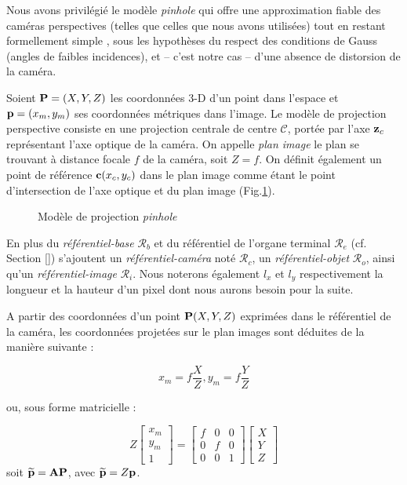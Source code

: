 Nous avons privilégié le modèle {\it pinhole} qui offre une approximation 
fiable des caméras perspectives (telles que celles que nous avons utilisées) 
tout en restant formellement simple\cite{Faugeras:1993} \cite{hartley2004}, 
sous 
les hypothèses du respect des conditions de Gauss (angles de faibles 
incidences), et -- c'est notre cas -- d'une absence de distorsion de la caméra.

Soient ${\bf P} = (X, Y, Z)$ les coordonnées 3-D d'un point dans l'espace et 
${\bf p} = (x_m, y_m)$ ses coordonnées m\'etriques dans l'image. Le modèle de 
projection perspective consiste en une projection centrale de centre $\mathcal 
C$, portée par l'axe ${\bf z}_c$ représentant l'axe optique de la caméra. On 
appelle {\it plan image} le plan se trouvant à distance focale $f$ de la 
caméra, 
soit $Z = f$. On définit également un point de référence ${\bf c}(x_c,y_c)$ 
dans 
le plan image comme étant le point d'intersection de l'axe optique et du plan 
image (Fig.\ref{intro:fig12}).

\begin{figure}[h!tp]
  \centering
  \def\svgwidth{.95\linewidth}
  
    \caption{\footnotesize{Modèle de projection {\it pinhole}}}
\label{intro:fig12}
\end{figure}

En plus du {\it référentiel-base} $\mathcal R_b$ et du r\'ef\'erentiel de 
l'organe terminal $\mathcal R_e$ (cf. Section \ref{}) s'ajoutent un 
{\it référentiel-caméra} noté $\mathcal R_c$, un {\it référentiel-objet} 
$\mathcal R_o$, ainsi qu'un {\it référentiel-image} $\mathcal R_i$. Nous 
noterons également $l_x$ et $l_y$ respectivement la longueur et la hauteur d'un 
pixel dont nous aurons besoin pour la suite.

A partir des coordonnées d'un point ${\bf P}(X, Y, Z)$ exprimées dans le 
référentiel de la caméra, les coordonnées projetées sur le plan images sont 
déduites de la manière suivante :

\begin{equation}
x_m = f \frac{X}{Z}, y_m = f \frac{Y}{Z}
\label{intro:eq12}
\end{equation}

ou, sous forme matricielle :

\begin{equation}
Z
\begin{bmatrix}
x_m \\y_m \\ 1
\end{bmatrix}
=
\begin{bmatrix}
f & 0 & 0 \\ 0 & f & 0 \\ 0 & 0 & 1 
\end{bmatrix}
\begin{bmatrix}
X \\ Y \\ Z 
\end{bmatrix}
\label{intro:eq13}
\end{equation}
soit $\widetilde {\bf p} = {\bf A}{\bf P}$, avec $\widetilde {\bf p} = Z {\bf 
p}$.

